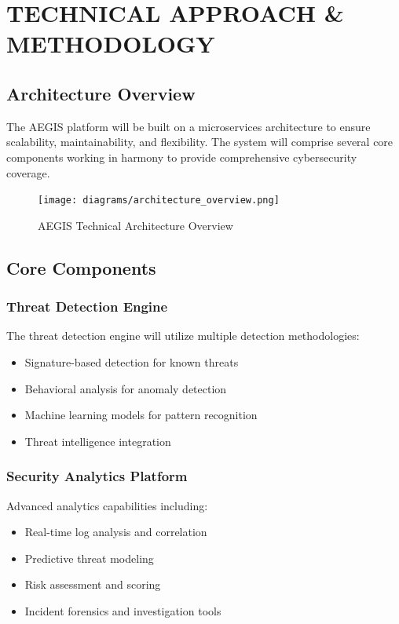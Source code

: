 \documentclass[12pt,a4paper]{article}
\begin{document}
\section{TECHNICAL APPROACH \& METHODOLOGY}

\subsection{Architecture Overview}

The AEGIS platform will be built on a microservices architecture to ensure scalability, maintainability, and flexibility. The system will comprise several core components working in harmony to provide comprehensive cybersecurity coverage.

\begin{figure}[H]
\centering
\texttt{[image: diagrams/architecture\_overview.png]}
\caption{AEGIS Technical Architecture Overview}
\label{fig:architecture}
\end{figure}

\subsection{Core Components}

\subsubsection{Threat Detection Engine}
The threat detection engine will utilize multiple detection methodologies:
\begin{itemize}
\item Signature-based detection for known threats
\item Behavioral analysis for anomaly detection
\item Machine learning models for pattern recognition
\item Threat intelligence integration
\end{itemize}

\subsubsection{Security Analytics Platform}
Advanced analytics capabilities including:
\begin{itemize}
\item Real-time log analysis and correlation
\item Predictive threat modeling
\item Risk assessment and scoring
\item Incident forensics and investigation tools
\end{itemize}
\end{document}
